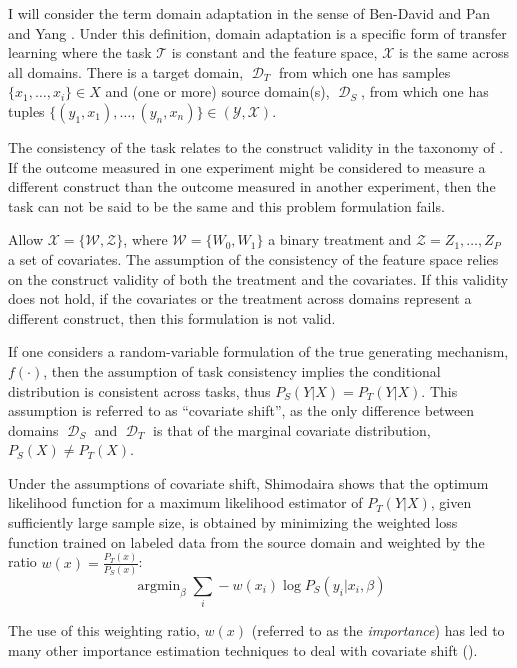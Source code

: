 \documentclass[a4paper,12pt]{article}
\DeclareMathOperator*{\argmin}{argmin}
\DeclareMathOperator*{\D}{\mathcal{D}}
\begin{document}
I will consider the term domain adaptation in the sense of Ben-David \parencite*{Ben-David2006} and Pan and Yang \parencite*{Pan2010}. Under this definition, domain adaptation is a specific form of transfer learning where the task $\mathcal{T}$ is constant and the feature space, $\mathcal{X}$ is the same across all domains. There is a target domain, $\D_T$ from which one has samples $\{x_1,\ldots,x_i\} \in X$ and (one or more) source domain(s), $\D_S$, from which one has tuples $\{(y_1, x_1),\dots,(y_n, x_n)\} \in (\mathcal{Y}, \mathcal{X})$. 

The consistency of the task relates to the construct validity in the taxonomy of \cite{Shadish2002}. If the outcome measured in one experiment might be considered to measure a different construct than the outcome measured in another experiment, then the task can not be said to be the same and this problem formulation fails. 

Allow $\mathcal{X} = \{\mathcal{W}, \mathcal{Z}\}$, where $\mathcal{W} = \{W_0, W_1\}$ a binary treatment and $\mathcal{Z} = {Z_1,\ldots,Z_P}$ a set of covariates. The assumption of the consistency of the feature space relies on the construct validity of both the treatment and the covariates. If this validity does not hold, if the covariates or the treatment across domains represent a different construct, then this formulation is not valid. 

If one considers a random-variable formulation of the true generating mechanism, $f(\cdot)$, then the assumption of task consistency implies the conditional distribution is consistent across tasks, thus $P_S(Y | X) = P_T(Y | X)$. This assumption is referred to as ``covariate shift'', as the only difference between domains $\D_S$ and $\D_T$ is that of the marginal covariate distribution, $P_S(X) \neq P_T(X)$. 

Under the assumptions of covariate shift, Shimodaira \parencite*{Shimodaira2000} shows that the optimum likelihood function for a maximum likelihood estimator of $P_T(Y | X)$, given sufficiently large sample size, is obtained by minimizing the weighted loss function trained on labeled data from the source domain and weighted by the ratio $w(x) = \frac{P_T(x)}{P_S(x)}$: 
%
$$
\argmin_{\beta} \sum_i -w(x_i) \log P_S(y_i | x_i, \beta)
$$

The use of this weighting ratio, $w(x)$ (referred to as the \textit{importance}) has led to many other importance estimation techniques to deal with covariate shift (\cite{Suigyama2007, Pan2010}). 
\end{document}
